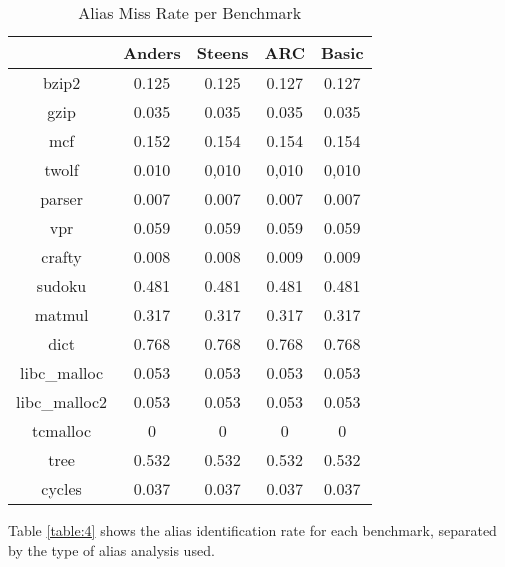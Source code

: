 \begin{table} [h!]
\centering
   \begin{tabular} {|c|c c c c|}
      \hline
      & Anders & Steens & ARC & Basic \\
      \hline
	   bzip2 & 0.125 & 0.125 & 0.127 & 0.127 \\
      \hline
	   gzip & 0.035 & 0.035 & 0.035 & 0.035 \\
      \hline
           mcf & 0.152 & 0.154 & 0.154 & 0.154 \\
      \hline
	   twolf & 0.010 & 0,010 & 0,010 & 0,010 \\
      \hline
	   parser & 0.007 & 0.007 & 0.007 & 0.007 \\
      \hline
	   vpr & 0.059 & 0.059 & 0.059 & 0.059 \\
      \hline
	   crafty & 0.008 & 0.008 & 0.009 & 0.009 \\
      \hline
	   sudoku & 0.481 & 0.481 & 0.481 & 0.481 \\
      \hline
	   matmul & 0.317 & 0.317 & 0.317 & 0.317 \\
      \hline
	   dict & 0.768 & 0.768 & 0.768 & 0.768 \\
      \hline
	   libc\_malloc & 0.053 & 0.053 & 0.053 & 0.053 \\
      \hline
	   libc\_malloc2 & 0.053 & 0.053 & 0.053 & 0.053 \\
      \hline
	   tcmalloc & 0 & 0 & 0 & 0 \\
      \hline
	   tree & 0.532 & 0.532 & 0.532 & 0.532 \\
      \hline
	   cycles & 0.037 & 0.037 & 0.037 & 0.037 \\
      \hline
   \end{tabular}
   \caption{Alias Miss Rate per Benchmark}
   \label{table:3}
\end{table}

\newpage

Table \ref{table:4} shows the alias identification rate for each benchmark, separated by the type of alias analysis used.

